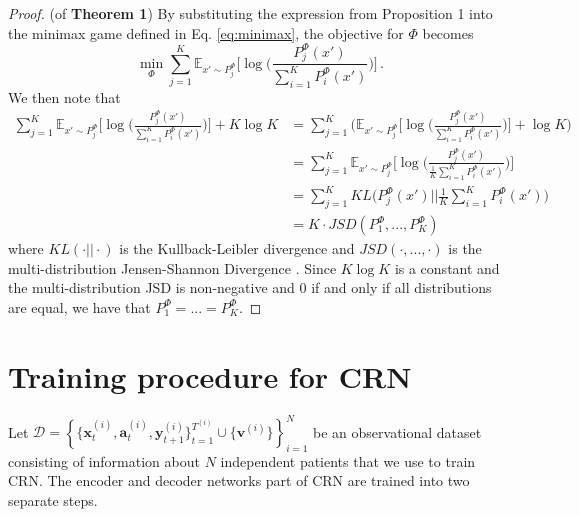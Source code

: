 \documentclass{article} %
\newcommand{\vc}[1]{\mathbf{#1}}
\newcommand{\cl}[1]{\mathcal{#1}}
\begin{document}
    \begin{proof} (of \textbf{Theorem 1}) By substituting the expression from Proposition 1 into the minimax game defined in Eq. \ref{eq:minimax}, the objective for $\Phi$ becomes
    \begin{equation}
        \min_{\Phi} \sum_{j = 1}^K \mathbb{E}_{x' \sim P^\Phi_j} \Big[\log \bigg(\frac{P^\Phi_j(x')}{\sum_{i=1}^K P^\Phi_i(x')}\bigg)\Big]\,.
    \end{equation}
    We then note that
    \begin{align}
        \sum_{j = 1}^K \mathbb{E}_{x' \sim P^\Phi_j} \Big[\log \bigg(\frac{P^\Phi_j(x')}{\sum_{i=1}^K P^\Phi_i(x')}\bigg)\Big] + K \log K &= \sum_{j = 1}^K \bigg(\mathbb{E}_{x' \sim P^\Phi_j} \Big[\log \bigg(\frac{P^\Phi_j(x')}{\sum_{i=1}^K P^\Phi_i(x')}\bigg)\Big] + \log K \bigg) \\
        &= \sum_{j = 1}^K \mathbb{E}_{x' \sim P^\Phi_j} \Big[\log \bigg(\frac{P^\Phi_j(x')}{\frac{1}{K}\sum_{i=1}^K P^\Phi_i(x')}\bigg)\Big] \\
        &= \sum_{j=1}^K KL\bigg(P^\Phi_j(x') \bigg| \bigg| \frac{1}{K}\sum_{i=1}^K P^\Phi_i(x') \bigg) \\
        &= K \cdot JSD(P^\Phi_1, ..., P^\Phi_K)
    \end{align}
    where $KL(\cdot||\cdot)$ is the Kullback-Leibler divergence and $JSD(\cdot, ..., \cdot)$ is the multi-distribution Jensen-Shannon Divergence \citep{li2018deep}. Since $K \log K$ is a constant and the multi-distribution JSD is non-negative and $0$ if and only if all distributions are equal, we have that $P^\Phi_1 = ... = P^\Phi_K$.
    \end{proof}
 
    \newpage	
	\section{Training procedure for CRN} \label{apx:training_procedure}
	
	Let $\cl{D} = \left\{ \{\vc{x}^{(i)}_{t},  \vc{a}^{(i)}_{t}, \vc{y}_{t+1}^{(i)} \}_{t=1}^{T^{(i)}} \cup \{\vc{v}^{(i)} \}  \right\}_{i=1}^N$ be an observational dataset consisting of information about $N$ independent patients that we use to train CRN. The encoder and decoder networks part of CRN are trained into two separate steps.
	
\end{document}
